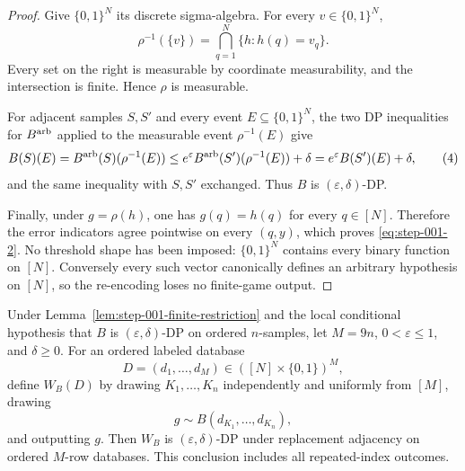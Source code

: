 \begin{proof}

Give \(\{0,1\}^N\) its discrete sigma-algebra. For every \(v \in \{0,1\}^N\),
\[
\rho^{-1}(\{v\})
=\bigcap_{q=1}^N\{h:h(q)=v_q\}.
\tag{3}\label{eq:step-001-3}
\]
Every set on the right is measurable by coordinate measurability, and the intersection is finite. Hence \(\rho\) is measurable.

For adjacent samples \(S,S'\) and every event \(E \subseteq \{0,1\}^N\), the two DP inequalities for \(B^{\rm arb}\) applied to the measurable event \(\rho^{-1}(E)\) give
\[
B(S)(E)
=B^{\rm arb}(S)(\rho^{-1}(E))
\le e^\varepsilon B^{\rm arb}(S')(\rho^{-1}(E))+\delta
=e^\varepsilon B(S')(E)+\delta,
\tag{4}\label{eq:step-001-4}
\]
and the same inequality with \(S,S'\) exchanged. Thus \(B\) is \((\varepsilon,\delta)\)-DP.

Finally, under \(g=\rho(h)\), one has \(g(q)=h(q)\) for every \(q \in [N]\). Therefore the error indicators agree pointwise on every \((q,y)\), which proves \eqref{eq:step-001-2}. No threshold shape has been imposed: \(\{0,1\}^N\) contains every binary function on \([N]\). Conversely every such vector canonically defines an arbitrary hypothesis on \([N]\), so the re-encoding loses no finite-game output.

\end{proof}


\begin{proposition}
\label{prop:step-001-private-wrapper}

Under Lemma~\ref{lem:step-001-finite-restriction} and the local conditional hypothesis that \(B\) is \((\varepsilon,\delta)\)-DP on ordered \(n\)-samples, let \(M=9n\), \(0<\varepsilon\le 1\), and \(\delta\ge 0\). For an ordered labeled database
\[
D=(d_1,\ldots,d_M)\in([N]\times\{0,1\})^M,
\]
define \(W_B(D)\) by drawing \(K_1,\ldots,K_n\) independently and uniformly from \([M]\), drawing
\[
g\sim B(d_{K_1},\ldots,d_{K_n}),
\]
and outputting \(g\). Then \(W_B\) is \((\varepsilon,\delta)\)-DP under replacement adjacency on ordered \(M\)-row databases. This conclusion includes all repeated-index outcomes.

\end{proposition}

